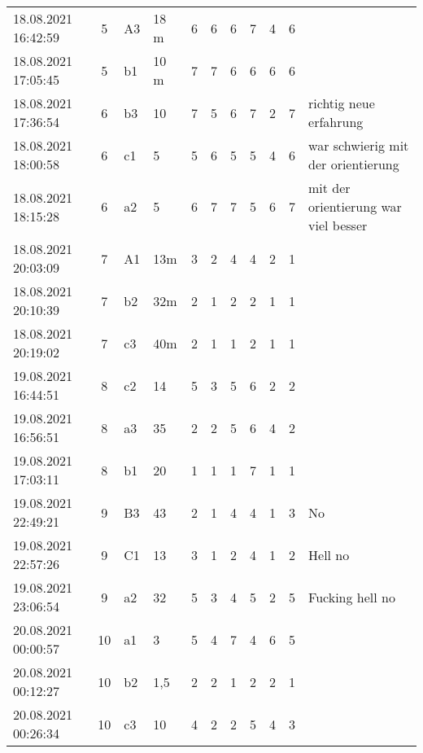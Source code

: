 \begin{landscape}
\begin{table}[]
\begin{tabular}{lcllccccccp{7cm}}
18.08.2021 16:42:59 & 5 & A3  & 18 m& 6  & 6  & 6  & 7  & 4  & 6 &                                                           \\
18.08.2021 17:05:45 & 5 & b1  & 10 m& 7  & 7  & 6  & 6  & 6  & 6 &                                                           \\
18.08.2021 17:36:54 & 6 & b3  & 10  & 7  & 5  & 6  & 7  & 2  & 7 & richtig neue erfahrung                                    \\
18.08.2021 18:00:58 & 6 & c1  & 5   & 5  & 6  & 5  & 5  & 4  & 6 & war schwierig mit der orientierung                        \\
18.08.2021 18:15:28 & 6 & a2  & 5   & 6  & 7  & 7  & 5  & 6  & 7 & mit der orientierung war viel besser                      \\
18.08.2021 20:03:09 & 7 & A1  & 13m & 3  & 2  & 4  & 4  & 2  & 1 &                                                           \\
18.08.2021 20:10:39 & 7 & b2  & 32m & 2  & 1  & 2  & 2  & 1  & 1 &                                                           \\
18.08.2021 20:19:02 & 7 & c3  & 40m & 2  & 1  & 1  & 2  & 1  & 1 &                                                           \\
19.08.2021 16:44:51 & 8 & c2  & 14  & 5  & 3  & 5  & 6  & 2  & 2 &                                                           \\
19.08.2021 16:56:51 & 8 & a3  & 35  & 2  & 2  & 5  & 6  & 4  & 2 &                                                           \\
19.08.2021 17:03:11 & 8 & b1  & 20  & 1  & 1  & 1  & 7  & 1  & 1 &                                                           \\
19.08.2021 22:49:21 & 9 & B3  & 43  & 2  & 1  & 4  & 4  & 1  & 3 & No                                                        \\
19.08.2021 22:57:26 & 9 & C1  & 13  & 3  & 1  & 2  & 4  & 1  & 2 & Hell no                                                   \\
19.08.2021 23:06:54 & 9 & a2  & 32  & 5  & 3  & 4  & 5  & 2  & 5 & Fucking hell no                                           \\
20.08.2021 00:00:57 & 10& a1  & 3   & 5  & 4  & 7  & 4  & 6  & 5 &                                                           \\
20.08.2021 00:12:27 & 10& b2  & 1,5 & 2  & 2  & 1  & 2  & 2  & 1 &                                                           \\
20.08.2021 00:26:34 & 10& c3  & 10  & 4  & 2  & 2  & 5  & 4  & 3 & \end{tabular}
\end{table}
\end{landscape}

